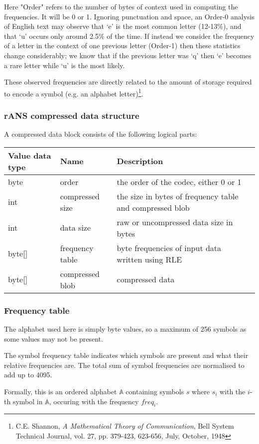 \documentclass[a4paper]{article}
\begin{document}
Here "Order" refers to the number of bytes of context used in
computing the frequencies. It will be 0 or 1.  Ignoring punctuation
and space, an Order-0 analysis of English text may observe that `e' is
the most common letter (12-13\%), and that `u' occurs only around 2.5\%
of the time.  If instead we consider the frequency of a letter in the
context of one previous letter (Order-1) then these statistics change
considerably;  we know that if the previous letter was `q' then `e'
becomes a rare letter while `u' is the most likely.

These observed frequencies are directly related to the amount of
storage required to encode a symbol (e.g. an alphabet
letter)\footnote{ C.E. Shannon, \textit{A Mathematical Theory of
    Communication}, Bell System Technical Journal, vol. 27,
    pp. 379-423, 623-656, July, October, 1948}.


\subsubsection{\textbf{rANS compressed data structure}}
A compressed data block consists of the following logical parts: 


\begin{tabular}{|l|l|>{\raggedright}p{100pt}|>{\raggedright}p{220pt}|}
\hline
\textbf{Value data type} & \textbf{Name} & \textbf{Description}\tabularnewline
\hline
byte & order & the order of the codec, either 0 or 1\tabularnewline
\hline
int & compressed size & the size in bytes of frequency table and compressed blob\tabularnewline
\hline
int & data size & raw or uncompressed data size in bytes\tabularnewline
\hline
byte[] & frequency table & byte frequencies of input data written using RLE\tabularnewline
\hline
byte[] & compressed blob & compressed data\tabularnewline
\hline
\end{tabular}

\subsubsection{\textbf{Frequency table}}

The alphabet used here is simply byte values, so a maximum of 256
symbols as some values may not be present.

The symbol frequency table indicates which symbols are present and
what their relative frequencies are.  The total sum of symbol
frequencies are normalised to add up to 4095.

Formally, this is an ordered alphabet $\mathbb{A}$ containing symbols $s$ where
$s_{i}$ with the $i$-th symbol in $\mathbb{A}$, occuring with the frequency $freq_{i}$.
\end{document}
